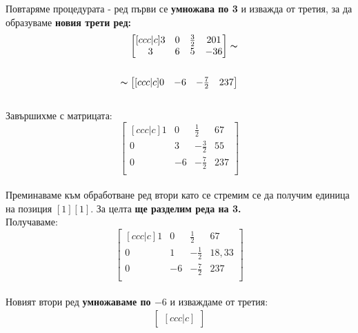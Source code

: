 \documentclass[12pt, a4paper]{article}
\begin{document}
\begin{enumerate}
{				Повтаряме процедурата - ред първи се \textbf{умножава по 3} и изважда от третия, за да образуваме \textbf{новия трети ред:}
				\begin{equation}
					\begin{split}
						\begin{bmatrix}[ccc|c]
							3 & 0 & \frac{3}{2} & 201 \\
							3 & 6 & 5 & -36 \\
						\end{bmatrix}\thicksim\\\\
						\thicksim
						\begin{bmatrix}[ccc|c]
							0 & -6 & -\frac{7}{2} & 237 \\
						\end{bmatrix}
					\end{split}
				\end{equation}\\
				Завършихме с матрицата:\\
				\begin{equation}
					\begin{bmatrix}[ccc|c]
						1 & 0 & \frac{1}{2} & 67\\
						0 & 3 & -\frac{3}{2} & 55\\
						0 & -6 & -\frac{7}{2} & 237\\
					\end{bmatrix}
				\end{equation}\\
				Преминаваме към обработване ред втори като се стремим се да получим единица на позиция $[1][1]$. За целта \textbf{ще разделим реда на 3.}\\
				Получаваме:\\
				\begin{equation}
					\begin{bmatrix}[ccc|c]
						1 & 0 & \frac{1}{2} & 67\\
						0 & 1 & -\frac{1}{2} & 18,33\\
						0 & -6 & -\frac{7}{2} & 237\\
					\end{bmatrix}
				\end{equation}\\
				Новият втори ред \textbf{умножаваме по $-6$} и изваждаме от третия:\\
				\begin{equation}
					\begin{split}
						\begin{bmatrix}[ccc|c]

\end{bmatrix}
\end{split}
\end{equation}}
\end{enumerate}
\end{document}
